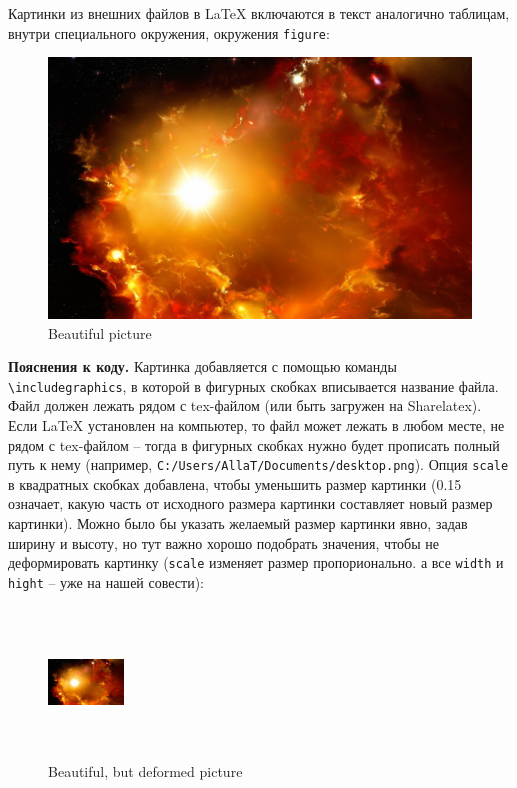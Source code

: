 \documentclass[12pt]{article}
\begin{document}
\newpage

Картинки из внешних файлов в \LaTeX{} включаются в текст аналогично таблицам, внутри специального окружения, окружения \texttt{figure}: 

\begin{LTXexample}
\begin{figure}[ht!]
    \centering
    \includegraphics[scale=0.15]{desktop.png}
    \caption{Beautiful picture}
\end{figure}
\end{LTXexample}

\textbf{Пояснения к коду.} Картинка добавляется с помощью команды  \texttt{\textbackslash includegraphics}, в которой в фигурных скобках вписывается название файла. Файл должен лежать рядом с tex-файлом (или быть загружен на Sharelatex). Если \LaTeX{} установлен на компьютер, то файл может лежать в любом месте, не рядом с tex-файлом -- тогда в фигурных скобках нужно будет прописать полный путь к нему (например, \texttt{C:/Users/AllaT/Documents/desktop.png}).  Опция \texttt{scale} в квадратных скобках добавлена, чтобы уменьшить размер картинки (0.15 означает, какую часть от исходного размера картинки составляет новый размер картинки). Можно было бы указать желаемый размер картинки явно, задав ширину и высоту, но тут важно хорошо подобрать значения, чтобы не деформировать картинку (\texttt{scale} изменяет размер пропорионально. а все \texttt{width} и \texttt{hight} -- уже на нашей совести):

\begin{LTXexample}
\begin{figure}[ht!]
    \centering
    \includegraphics[width=2cm, height=4cm]{desktop.png}
    \caption{Beautiful, but deformed picture}
\end{figure}
\end{LTXexample}
\end{document}
